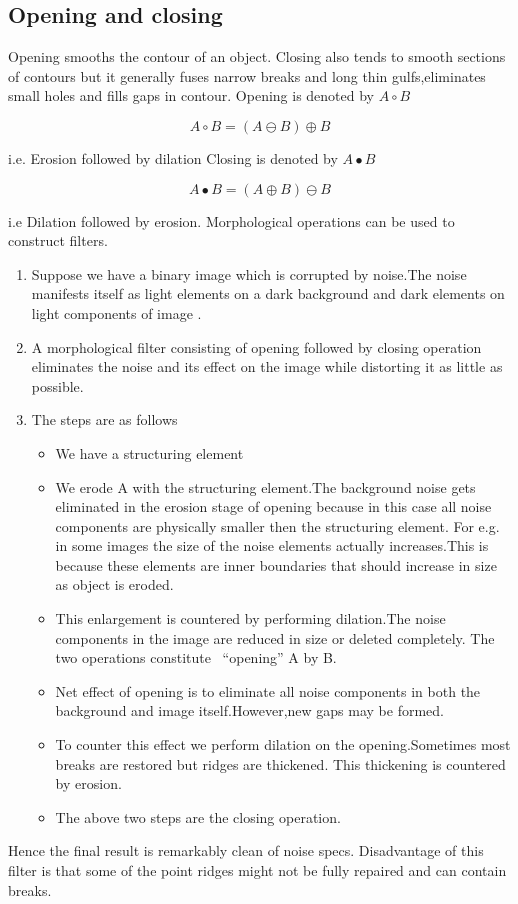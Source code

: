 \subsection{Opening and closing}

Opening smooths the contour of an object.
 Closing also tends to smooth sections of contours but it generally fuses narrow breaks and long thin gulfs,eliminates small holes and fills gaps in contour.
Opening is denoted by $A\circ B$

\[A\circ B=(A\ominus B)\oplus B\]

  i.e. Erosion followed by dilation
 Closing is denoted by $A\bullet B$

 \[A\bullet B=(A\oplus B)\ominus B\]

 i.e Dilation followed by erosion.
 Morphological operations can be used to construct filters.

\begin{enumerate}
	\item Suppose we have a binary image which is corrupted by noise.The noise manifests itself as light elements on a dark background and dark elements on  light components of image .
	\item A morphological filter consisting of opening followed by closing operation eliminates the noise and its effect on the image while distorting it as little as possible.
	\item The steps are as follows

\begin{itemize}
	\item We have a structuring element
	\item We erode A with the structuring element.The background noise gets eliminated in the erosion stage of opening because in this case all noise components are physically smaller then the structuring element.
For e.g. in some images the size of the noise elements actually increases.This is because these elements are inner boundaries that should increase in size as object is eroded.
\item This enlargement is countered by performing dilation.The noise components in the image are reduced in size or deleted completely.
The two operations constitute ~``opening'' A by B.
\item Net effect of opening is to eliminate all noise components in both the background and image itself.However,new gaps may be formed.
\item To counter this effect we perform dilation on the opening.Sometimes most breaks are restored but ridges are thickened.
This thickening is countered by erosion.
\item The above two steps are the closing operation.
\end{itemize}

\end{enumerate}
Hence the final result is remarkably clean of noise specs.
 Disadvantage of this filter is that some of the point ridges might not be fully repaired and can contain breaks. \\

